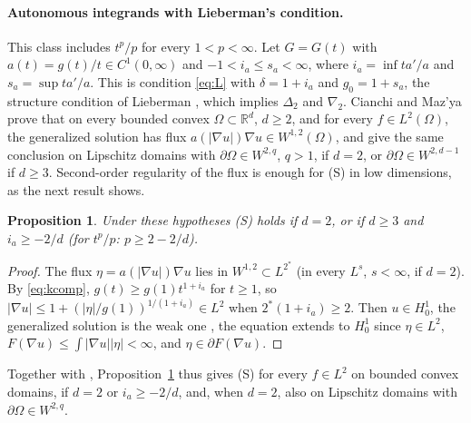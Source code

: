 \documentclass[11pt]{amsart}
\newtheorem{proposition}[theorem]{Proposition}
\theoremstyle{definition}
\theoremstyle{remark}
\numberwithin{equation}{section}
\newcommand{\R}{\mathbb{R}}
\newcommand{\abs}[1]{\lvert #1\rvert}
\begin{document}
\paragraph{Autonomous integrands with Lieberman's condition.}
This class includes $t^p/p$ for every $1<p<\infty$. Let $G=G(t)$ with $a(t)=g(t)/t\in C^1(0,\infty)$ and $-1<i_a\le s_a<\infty$, where $i_a=\inf ta'/a$ and $s_a=\sup ta'/a$. This is condition \eqref{eq:L} with $\delta=1+i_a$ and $g_0=1+s_a$, the structure condition of Lieberman \cite{Lieberman1991}, which implies $\Delta_2$ and $\nabla_2$. Cianchi and Maz'ya \cite[Thm.~2.3]{CianchiMazya2018} prove that on every bounded convex $\Omega\subset\R^d$, $d\ge2$, and for every $f\in L^2(\Omega)$, the generalized solution has flux $a(\abs{\nabla u})\nabla u\in W^{1,2}(\Omega)$, and \cite[Thm.~2.4, Rem.~2.6]{CianchiMazya2018} give the same conclusion on Lipschitz domains with $\partial\Omega\in W^{2,q}$, $q>1$, if $d=2$, or $\partial\Omega\in W^{2,d-1}$ if $d\ge3$. Second-order regularity of the flux is enough for (S) in low dimensions, as the next result shows.
\begin{proposition}\label{prop:S-CM}
Under these hypotheses \textup{(S)} holds if $d=2$, or if $d\ge3$ and $i_a\ge-2/d$ \textup(for $t^p/p$: $p\ge2-2/d$\textup).
\end{proposition}
\begin{proof}
The flux $\eta=a(\abs{\nabla u})\nabla u$ lies in $W^{1,2}\subset L^{2^*}$ (in every $L^s$, $s<\infty$, if $d=2$). By \eqref{eq:kcomp}, $g(t)\ge g(1)t^{1+i_a}$ for $t\ge1$, so $\abs{\nabla u}\le1+(\abs\eta/g(1))^{1/(1+i_a)}\in L^2$ when $2^*(1+i_a)\ge2$. Then $u\in H^1_0$, the generalized solution is the weak one \cite[Rem.~2.8]{CianchiMazya2018}, the equation extends to $H^1_0$ since $\eta\in L^2$, $F(\nabla u)\le\int\abs{\nabla u}\abs\eta<\infty$, and $\eta\in\partial F(\nabla u)$.
\end{proof}
Together with \cite[Thms.~2.3--2.4]{CianchiMazya2018}, Proposition~\ref{prop:S-CM} thus gives (S) for every $f\in L^2$ on bounded convex domains, if $d=2$ or $i_a\ge-2/d$, and, when $d=2$, also on Lipschitz domains with $\partial\Omega\in W^{2,q}$.
\end{document}
